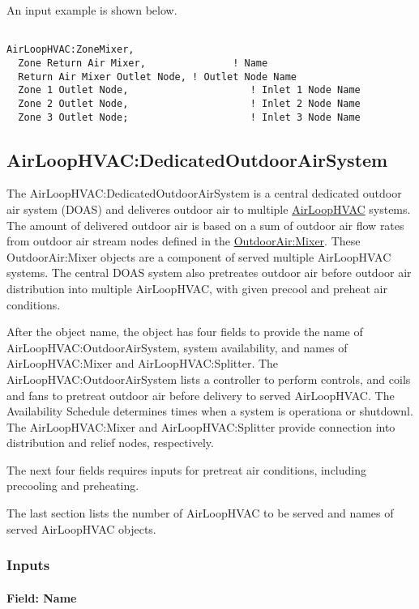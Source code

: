 An input example is shown below.

\begin{lstlisting}

AirLoopHVAC:ZoneMixer,
  Zone Return Air Mixer,               ! Name
  Return Air Mixer Outlet Node, ! Outlet Node Name
  Zone 1 Outlet Node,                     ! Inlet 1 Node Name
  Zone 2 Outlet Node,                     ! Inlet 2 Node Name
  Zone 3 Outlet Node;                     ! Inlet 3 Node Name
\end{lstlisting}

\subsection{AirLoopHVAC:DedicatedOutdoorAirSystem}\label{airloophvacdedicatedoutdoorairsystem}

The AirLoopHVAC:DedicatedOutdoorAirSystem is a central dedicated outdoor air system (DOAS) and deliveres outdoor air to multiple \hyperref[airloophvac]{AirLoopHVAC} systems. The amount of delivered outdoor air is based on a sum of outdoor air flow rates from outdoor air stream nodes defined in the \hyperref[outdoorairmixer]{OutdoorAir:Mixer}. These OutdoorAir:Mixer objects are a component of served multiple AirLoopHVAC systems. The central DOAS system also pretreates outdoor air before outdoor air distribution into multiple AirLoopHVAC, with given precool and preheat air conditions.

After the object name, the object has four fields to provide the name of AirLoopHVAC:OutdoorAirSystem, system availability, and names of AirLoopHVAC:Mixer and AirLoopHVAC:Splitter. The AirLoopHVAC:OutdoorAirSystem lists a controller to perform controls, and coils and fans to pretreat outdoor air before delivery to served AirLoopHVAC. The Availability Schedule determines times when a system is operationa or shutdownl. The AirLoopHVAC:Mixer and AirLoopHVAC:Splitter provide connection into distribution and relief nodes, respectively.

The next four fields requires inputs for pretreat air conditions, including precooling and preheating.

The last section lists the number of AirLoopHVAC to be served and names of served AirLoopHVAC objects.

\subsubsection{Inputs}

\paragraph{Field: Name}

